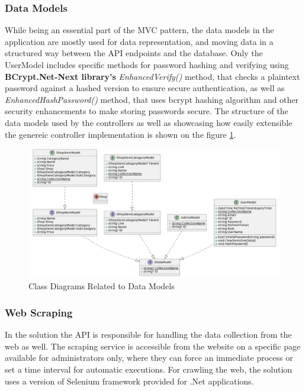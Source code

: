 \subsubsection{Data Models}

While being an essential part of the MVC pattern, the  data models in the application are mostly used for data representation, and moving data in a structured way between the API endpoints and the database. Only the UserModel includes specific methods for password hashing and verifying using \textbf{BCrypt.Net-Next library's} \textit{EnhancedVerify()} method, that checks a plaintext password against a hashed version to ensure secure authentication, as well as \textit{EnhancedHashPassword()} method, that uses bcrypt hashing algorithm and other security enhancements to make storing passwords secure. The structure of the data models used by the controllers as well as showcasing how easily extensible the genereic controller implementation is shown on the figure \ref{fig:dcd}.

\begin{figure}[H]
	\centering
	\includegraphics[width=1\linewidth]{img/datamodel_classdiagram.png}
	\caption{Class Diagrams Related to Data Models}
	\label{fig:dcd}
\end{figure}

\newpage

\subsubsection{Web Scraping}
In the solution the API is responsible for handling the data collection from the web as well. The scraping service is accessible from the website on a specific page available for administrators only, where they can force an immediate process or set a time interval for automatic executions. For crawling the web, the solution uses a version of Selenium framework provided for .Net applications.

